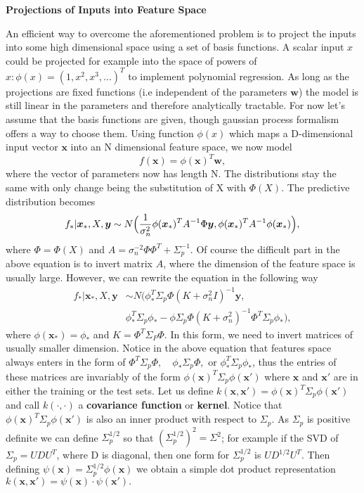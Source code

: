 \documentclass[12pt,a4paper,oneside]{book}
\theoremstyle{plain}
\theoremstyle{definition}
\begin{document}
{\begin{center}
\textbf{Projections of Inputs into Feature Space}
\end{center}
\vspace{6mm}
An efficient way to overcome the aforementioned problem is to project the inputs into some high dimensional space using a set of basis functions. A scalar input $x$ could be projected for example into the space of powers of $x:\phi(x)=(1,x^2,x^3,...)^T$ to implement polynomial regression. As long as the projections are fixed functions (i.e independent of the parameters $\bm{w}$) the model is still linear in the parameters and therefore analytically tractable. For now let's assume that the basis functions are given, though gaussian process formalism offers a way to choose them. 
\vspace{3mm}\newline
Using function $\phi(x)$ which maps a D-dimensional input vector $\bm{x}$ into an N dimensional feature space, we now model $$f(\bm{x})=\phi(\bm{x})^T\bm{w},$$ where the vector of parameters now has length N. The distributions stay the same with only change being the substitution of X with $\Phi(X)$. The predictive distribution becomes $$f_*|\bm{x}_*,X,\bm{y} \sim N\Big{(} \frac{1}{\sigma_n^2}\phi (\bm{x}_*)^T A^{-1}\Phi\bm{y}, \phi(\bm{x}_*)^T A^{-1}\phi(\bm{x}_*)\Big{)},$$
where $\Phi=\Phi(X)$ and $A=\sigma_n^{-2}\Phi \Phi ^T + \Sigma_p^{-1}.$ Of course the difficult part in the above equation is to invert matrix $A$, where the dimension of the feature space is usually large. However, we can rewrite the equation in the following way 
\begin{align*}
f_*|\bm{x}_*,X,\bm{y}&\sim N(\phi_*^T \Sigma_p \Phi(K+ \sigma_n^2 I)^{-1}\bm{y},\\
& \phi _*^T \Sigma_p \phi_* - \phi \Sigma_p \Phi(K+\sigma_n^2)^{-1}\Phi^T\Sigma_p\phi_*),
\end{align*}
where $\phi(\bm{x}_*)=\phi_*$ and $K=\Phi^T \Sigma_P \Phi.$ In this form, we need to invert matrices of usually smaller dimension.
\vspace{3mm}\newline
Notice in the above equation that features space always enters in the form of $\Phi^T \Sigma_p \Phi, \quad \phi_* \Sigma_p \Phi,$ or $\phi_*^T\Sigma_p\phi _*$, thus the entries of these matrices are invariably of the form $\phi(\bm{x})^T\Sigma_p \phi(\bm{x}')$ where $\bm{x}$ and $\bm{x}'$ are in either the training or the test sets. Let us define $k(\bm{x},\bm{x}')=\phi(\bm{x})^T\Sigma_p \phi(\bm{x}')$ and call $k(\cdot,\cdot)$ a \textbf{covariance function} or \textbf{kernel}. Notice that $\phi(\bm{x})^T \Sigma_p \phi(\bm{x}')$ is also an inner product with respect to $\Sigma_p.$ As $\Sigma_p$ is positive definite we can define $\Sigma_p^{1/2}$ so that $(\Sigma_p^{1/2})^2=\Sigma^2$; for example if the SVD of $\Sigma_p=UDU^T$, where D is diagonal, then one form for $\Sigma_p^{1/2}$ is $UD^{1/2}U^T.$ Then defining $\psi	(\bm{x})=\Sigma_p^{1/2}\phi(\bm{x})$ we obtain a simple dot product representation $k(\bm{x},\bm{x}')=\psi	(\bm{x})\cdot \psi	(\bm{x}').$   
}
\end{document}
